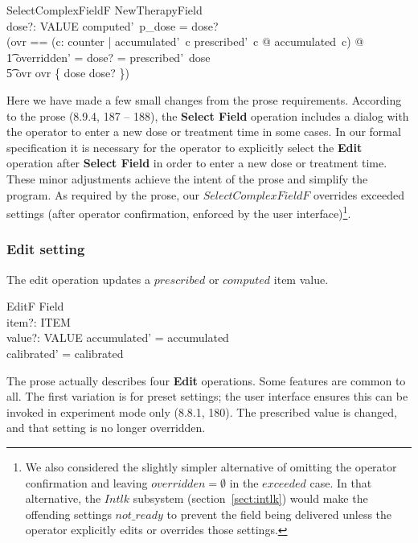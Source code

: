 \documentclass{article}
\begin{document}
\begin{schema}{SelectComplexFieldF}
	NewTherapyField \\
	dose?: VALUE
\where
computed'~p\_dose = dose? \\
(\LET ovr == 
 (\lambda c: counter | accumulated'~c \geq prescribed'~c @ accumulated~c) @ \\
\t1  overridden' = \IF dose? = prescribed'~dose \\
\t5			\THEN ovr \ELSE ovr \cup \{ dose \mapsto dose? \})
\end{schema}
Here we have made a few small changes from the prose requirements.
According to the prose (8.9.4, 187 -- 188), the {\bf Select Field}
operation includes a dialog with the operator to enter a new dose or
treatment time in some cases.  In our formal specification it is
necessary for the operator to explicitly select the {\bf Edit}
operation after {\bf Select Field} in order to enter a new dose or
treatment time.  These minor adjustments achieve the intent of the
prose and simplify the program.  As required by the prose, our
$SelectComplexFieldF$ overrides exceeded settings (after operator
confirmation, enforced by the user interface)\footnote{We also
considered the slightly simpler alternative of omitting the operator
confirmation and leaving $overridden = \emptyset$ in the $exceeded$
case.  In that alternative, the $Intlk$ subsystem
(section~\ref{sect:intlk}) would make the offending settings
$not\_ready$ to prevent the field being delivered unless the operator
explicitly edits or overrides those settings.}.

\subsubsection{Edit setting}  \label{sect:editf}

The edit operation updates a $prescribed$ or $computed$ item value.

\begin{schema}{EditF}
	\Delta Field \\
	item?: ITEM \\
	value?: VALUE 
\where
	accumulated' = accumulated \\
	calibrated' = calibrated
\end{schema}
The prose actually describes four {\bf Edit} operations.  Some
features are common to all.  The first variation is for preset
settings; the user interface ensures this can be invoked in experiment
mode only (8.8.1, 180).  The prescribed value is changed, and that
setting is no longer overridden.
\end{document}
